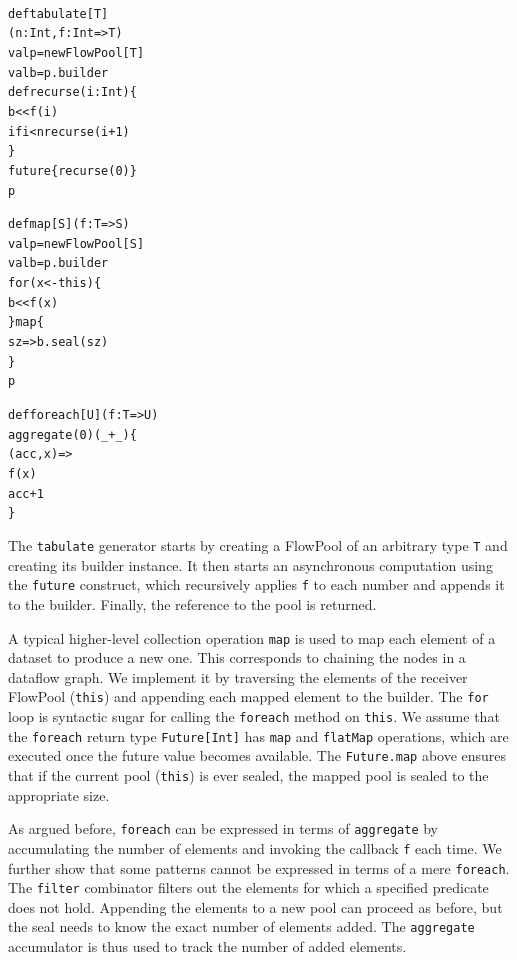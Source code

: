 \documentclass[runningheads,a4paper]{llncs}
\begin{document}
\noindent
\begin{minipage}[b]{4.2 cm}
\begin{alltt}
{\scriptsize
def tabulate[T]
  (n: Int, f: Int => T)
  val p = new FlowPool[T]
  val b = p.builder
  def recurse(i: Int) \{
    b << f(i)
    if i < n recurse(i + 1)
  \}
  future \{ recurse(0) \}
  p
}
\end{alltt}
\end{minipage}\begin{minipage}[b]{4 cm}
\begin{alltt}
{\scriptsize
def map[S](f: T => S)
  val p = new FlowPool[S]
  val b = p.builder
  for (x <- this) \{
    b << f(x)
  \} map \{
    sz => b.seal(sz)
  \}
  p

}
\end{alltt}
\end{minipage}
\begin{minipage}[b]{2.5 cm}
\begin{alltt}
{\scriptsize
def foreach[U](f: T => U)
  aggregate(0)(_ + _) \{
    (acc, x) =>
    f(x)
    acc + 1
  \}




}
\end{alltt}
\end{minipage}

The \verb=tabulate= generator starts by creating a FlowPool of an
arbitrary type \verb=T= and creating its builder instance.
It then starts an asynchronous computation using the \verb=future=
construct, which recursively applies \verb=f= to each number and
appends it to the builder.
Finally, the reference to the pool is returned.

 A typical higher-level collection operation \verb=map= is used to
map each element of a dataset to produce a new one.
This corresponds to chaining the nodes in a dataflow graph.
We implement it by traversing the elements of the receiver FlowPool (\verb=this=)
and
appending each mapped element to the builder.
The \verb=for= loop is syntactic sugar for calling the
\verb=foreach= method on \verb=this=.
We assume that the \verb=foreach= return type \verb=Future[Int]=
has \verb=map= and \verb=flatMap= operations, which are executed
once the future value becomes available.
The \verb=Future.map= above ensures that if the current pool (\verb=this=) is ever
sealed, the mapped pool is sealed to the appropriate size.

As argued before, \verb=foreach= can be expressed in terms of
\verb=aggregate= by accumulating the number of elements and invoking the
callback \verb=f= each time.
We further show that some patterns cannot be expressed in terms of a mere
\verb=foreach=.
The \verb=filter= combinator filters out the elements for which a
specified predicate does not hold.
Appending the elements to a new pool can proceed as
before, but the seal needs to know the exact number of elements added.
The \verb=aggregate= accumulator is thus used to track the number
of added elements.
\end{document}
